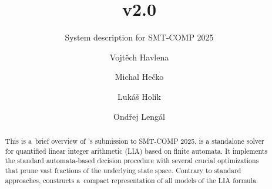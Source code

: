 \documentclass[acmsmall,screen,nonacm=true]{acmart}
\begin{document}
\title{\amaya v2.0}
\subtitle{System description for SMT-COMP 2025}

\author{Vojtěch Havlena}

\author{Michal Hečko}

\author{Lukáš Holík}

\author{Ondřej Lengál}



\begin{abstract}
  This is a~brief overview of \amaya's submission to SMT-COMP 2025.
  \amaya is a standalone solver for quantified linear integer arithmetic (LIA) based on finite automata.
  It implements the standard automata-based decision procedure with several crucial optimizations that prune vast fractions of the underlying state space.
  Contrary to standard approaches, \amaya constructs a~compact representation of all models of the LIA formula.
\end{abstract}

\maketitle
\end{document}
